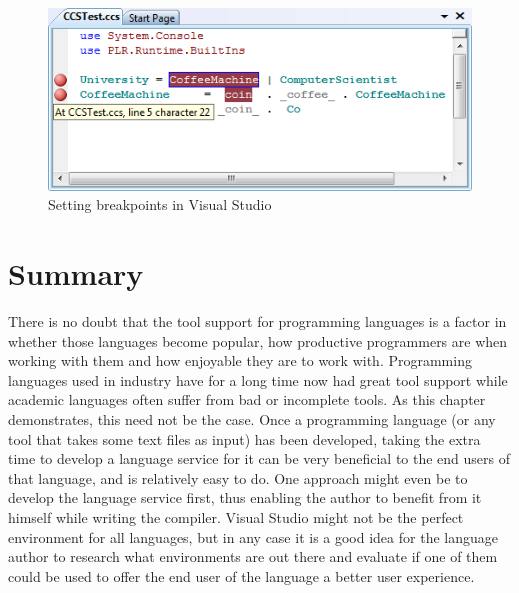 	\begin{figure}[h!]
		\centering
		\includegraphics[scale=0.5]{breakpoint.png}
		\caption{Setting breakpoints in Visual Studio}
		\label{fig:breakpoint}
	\end{figure}
	
	\section{Summary}
	
	There is no doubt that the tool support for programming languages is a 
	factor in whether those languages become popular, how productive programmers 
	are when working with them and how enjoyable they are to work with. 
	Programming languages used in industry have for a long time now had great 
	tool support while academic languages often suffer from bad or incomplete 
	tools. As this chapter demonstrates, this need not be the case. Once a 
	programming language (or any tool that takes some text files as input) has 
	been developed, taking the extra time to develop a language service for it 
	can be very beneficial to the end users of that language, and is relatively 
	easy to do. One approach might even be to develop the language service 
	first, thus enabling the author to benefit from it himself while writing the 
	compiler. Visual Studio might not be the perfect environment for all 
	languages, but in any case it is a good idea for the language author to 
	research what environments are out there and evaluate if one of them could 
	be used to offer the end user of the language a better user experience.